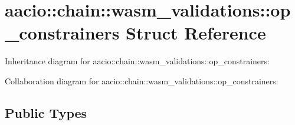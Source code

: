 \hypertarget{structaacio_1_1chain_1_1wasm__validations_1_1op__constrainers}{}\section{aacio\+:\+:chain\+:\+:wasm\+\_\+validations\+:\+:op\+\_\+constrainers Struct Reference}
\label{structaacio_1_1chain_1_1wasm__validations_1_1op__constrainers}


Inheritance diagram for aacio\+:\+:chain\+:\+:wasm\+\_\+validations\+:\+:op\+\_\+constrainers\+:


Collaboration diagram for aacio\+:\+:chain\+:\+:wasm\+\_\+validations\+:\+:op\+\_\+constrainers\+:
\subsection*{Public Types}
